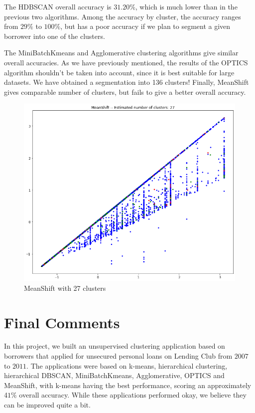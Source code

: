 \documentclass[a4paper,11pt]{amsart}
\begin{document}
\medbreak

The HDBSCAN overall accuracy is $31.20\%$, which is much lower than in the previous two algorithms. Among the accuracy by cluster, the accuracy ranges from $29\%$ to $100\%$, but has a poor accuracy if we plan to segment a given borrower into one of the clusters.

\medbreak

The MiniBatchKmeans and Agglomerative clustering algorithms give similar overall accuracies. As we have previously mentioned, the results of the OPTICS algorithm shouldn't be taken into account, since it is best suitable for large datasets. We have obtained a segmentation into 136 clusters! Finally, MeanShift gives comparable number of clusters, but fails to give a better overall accuracy.

\begin{figure}
 \includegraphics[width=.8\linewidth]{download-1.png}
  \caption{MeanShift with 27 clusters}
  \label{fig:loan}
\end{figure}

\section{Final Comments}\label{future}
In this project, we built an unsupervised clustering application based on borrowers that applied for unsecured personal loans on Lending Club from $2007$ to $2011$. The applications were based on k-means, hierarchical clustering, hierarchical DBSCAN, MiniBatchKmeans, Agglomerative, OPTICS and MeanShift, with k-means having the best performance, scoring an approximately 4$1\%$ overall accuracy.
While these applications performed okay, we believe they can be improved quite a bit. 
\end{document}
